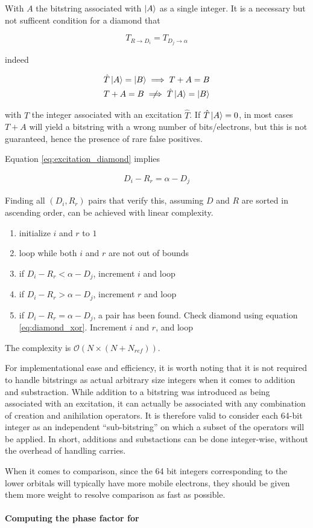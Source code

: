 \documentclass[./thesis.tex]{subfiles}
\begin{document}
With $A$ the bitstring associated with $\ket A$ as a single integer. It is a necessary but not sufficent condition for a diamond that

\begin{equation}
T_{R \rightarrow D_i} = T_{D_j \rightarrow \alpha}
\end{equation}

indeed 

\begin{align}
\hat T \ket A = \ket B \implies  T + A = B\\
T + A = B \centernot \implies \hat T \ket A = \ket B
\end{align}

with $T$ the integer associated with an excitation $\hat T$. If $\hat T \ket A = 0$, in most cases $T + A$ will yield a bitstring with a wrong number of bits/electrons, but this is not guaranteed, hence the presence of rare false positives.

Equation \ref{eq:excitation_diamond} implies

\begin{align}
D_i - R_r = \alpha - D_j 
\end{align}

Finding all $(D_i, R_r)$ pairs that verify this, assuming $D$ and $R$ are sorted in ascending order, can be achieved with linear complexity.


\begin{enumerate}
\item
initialize $i$ and $r$ to $1$
\item
loop while both $i$ and $r$ are not out of bounds
\item
if $D_i - R_r < \alpha - D_j$, increment $i$ and loop
\item
if $D_i - R_r > \alpha - D_j$, increment $r$ and loop
\item
if $D_i - R_r = \alpha - D_j$, a pair has been found. Check diamond using equation \ref{eq:diamond_xor}. Increment $i$ and $r$, and loop
\end{enumerate}

The complexity is $\mathcal{O}(N \times (N+N_{ref}))$.


For implementational ease and efficiency, it is worth noting that it is not required to handle bitstrings as actual arbitrary size integers when it comes to addition and substraction. While addition to a bitstring was introduced as being associated with an excitation, it can actually be associated with any combination of creation and anihilation operators. It is therefore valid to consider each 64-bit integer as an independent ``sub-bitstring'' on which a subset of the operators will be applied. In short, additions and substactions can be done integer-wise, without the overhead of handling carries.

When it comes to comparison, since the 64 bit integers corresponding to the lower orbitals will typically have more mobile electrons, they should be given them more weight to resolve comparison as fast as possible.

\paragraph{Computing the phase factor for }
\end{document}

